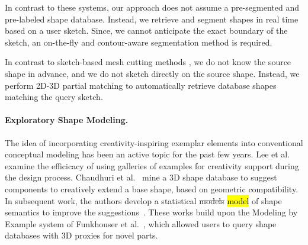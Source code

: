 In contrast to these systems, our approach does not assume a pre-segmented and pre-labeled shape database. Instead, we retrieve and segment shapes in real time based on a user sketch. Since, we cannot anticipate the exact boundary of the sketch, an on-the-fly and contour-aware segmentation method is required.

In contrast to sketch-based mesh cutting methods \cite{FanMeshCutting2012}, we do not know the source shape in advance, and we do not sketch directly on the source shape. Instead, we perform 2D-3D partial matching to automatically retrieve database shapes matching the query sketch.


\paragraph*{Exploratory Shape Modeling.} The idea of incorporating creativity-inspiring exemplar elements into conventional conceptual modeling has been an active topic for the past few years.
Lee et al.  examine the efficicacy of using galleries of examples for creativity support during the design process.
Chaudhuri et al.~ mine a 3D shape database to suggest components to creatively extend a base shape, based on geometric compatibility. In subsequent work, the authors develop a statistical \st{models} \hl{model} of shape semantics to improve the suggestions~\cite{probabilisticreasoningvladlensg2011}. These works build upon the Modeling by Example system of Funkhouser et al.~, which allowed users to query shape databases with 3D proxies for novel parts.

%

